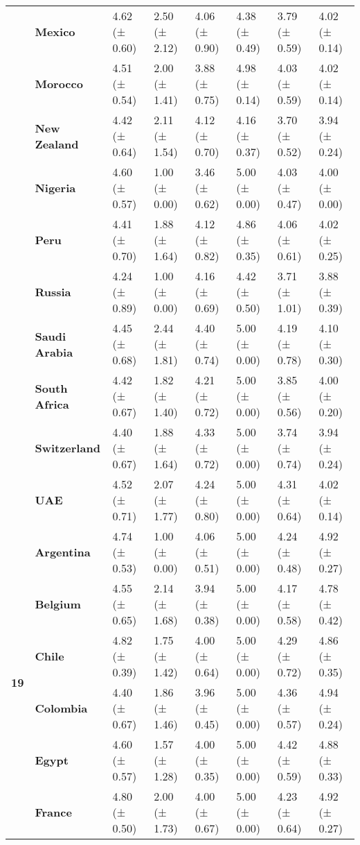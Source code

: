 \begin{longtable}{llllllll}
\textbf{} & \textbf{Mexico} & 4.62 (± 0.60) & 2.50 (± 2.12) & 4.06 (± 0.90) & 4.38 (± 0.49) & 3.79 (± 0.59) & 4.02 (± 0.14) \\
\textbf{} & \textbf{Morocco} & 4.51 (± 0.54) & 2.00 (± 1.41) & 3.88 (± 0.75) & 4.98 (± 0.14) & 4.03 (± 0.59) & 4.02 (± 0.14) \\
\textbf{} & \textbf{New Zealand} & 4.42 (± 0.64) & 2.11 (± 1.54) & 4.12 (± 0.70) & 4.16 (± 0.37) & 3.70 (± 0.52) & 3.94 (± 0.24) \\
\textbf{} & \textbf{Nigeria} & 4.60 (± 0.57) & 1.00 (± 0.00) & 3.46 (± 0.62) & 5.00 (± 0.00) & 4.03 (± 0.47) & 4.00 (± 0.00) \\
\textbf{} & \textbf{Peru} & 4.41 (± 0.70) & 1.88 (± 1.64) & 4.12 (± 0.82) & 4.86 (± 0.35) & 4.06 (± 0.61) & 4.02 (± 0.25) \\
\textbf{} & \textbf{Russia} & 4.24 (± 0.89) & 1.00 (± 0.00) & 4.16 (± 0.69) & 4.42 (± 0.50) & 3.71 (± 1.01) & 3.88 (± 0.39) \\
\textbf{} & \textbf{Saudi Arabia} & 4.45 (± 0.68) & 2.44 (± 1.81) & 4.40 (± 0.74) & 5.00 (± 0.00) & 4.19 (± 0.78) & 4.10 (± 0.30) \\
\textbf{} & \textbf{South Africa} & 4.42 (± 0.67) & 1.82 (± 1.40) & 4.21 (± 0.72) & 5.00 (± 0.00) & 3.85 (± 0.56) & 4.00 (± 0.20) \\
\textbf{} & \textbf{Switzerland} & 4.40 (± 0.67) & 1.88 (± 1.64) & 4.33 (± 0.72) & 5.00 (± 0.00) & 3.74 (± 0.74) & 3.94 (± 0.24) \\
\textbf{} & \textbf{UAE} & 4.52 (± 0.71) & 2.07 (± 1.77) & 4.24 (± 0.80) & 5.00 (± 0.00) & 4.31 (± 0.64) & 4.02 (± 0.14) \\
\cline{1-8}
\multirow[t]{19}{*}{\textbf{19}} & \textbf{Argentina} & 4.74 (± 0.53) & 1.00 (± 0.00) & 4.06 (± 0.51) & 5.00 (± 0.00) & 4.24 (± 0.48) & 4.92 (± 0.27) \\
\textbf{} & \textbf{Belgium} & 4.55 (± 0.65) & 2.14 (± 1.68) & 3.94 (± 0.38) & 5.00 (± 0.00) & 4.17 (± 0.58) & 4.78 (± 0.42) \\
\textbf{} & \textbf{Chile} & 4.82 (± 0.39) & 1.75 (± 1.42) & 4.00 (± 0.64) & 5.00 (± 0.00) & 4.29 (± 0.72) & 4.86 (± 0.35) \\
\textbf{} & \textbf{Colombia} & 4.40 (± 0.67) & 1.86 (± 1.46) & 3.96 (± 0.45) & 5.00 (± 0.00) & 4.36 (± 0.57) & 4.94 (± 0.24) \\
\textbf{} & \textbf{Egypt} & 4.60 (± 0.57) & 1.57 (± 1.28) & 4.00 (± 0.35) & 5.00 (± 0.00) & 4.42 (± 0.59) & 4.88 (± 0.33) \\
\textbf{} & \textbf{France} & 4.80 (± 0.50) & 2.00 (± 1.73) & 4.00 (± 0.67) & 5.00 (± 0.00) & 4.23 (± 0.64) & 4.92 (± 0.27) \\

\end{longtable}
